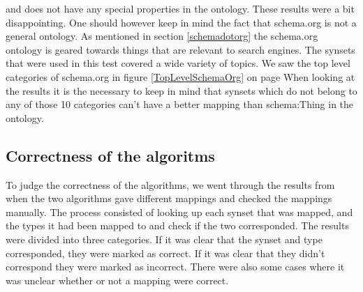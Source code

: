 and does not have any special properties in the ontology.
These results were a bit disappointing.
One should however keep in mind the fact that schema.org is not a general ontology.
As mentioned in section \ref{schemadotorg} the schema.org ontology is geared towards things that are relevant to search engines.
The synsets that were used in this test covered a wide variety of topics.
We saw the top level categories of schema.org in figure \ref {TopLevelSchemaOrg} on page \pageref{TopLevelSchemaOrg}
When looking at the results it is the necessary to keep in mind that
synsets which do not belong to any of those 10 categories can't have a better mapping than schema:Thing in the ontology.

\subsection{Correctness of the algoritms}
To judge the correctness of the algorithms,
we went through the results from when the two algorithms gave different mappings and checked the mappings manually.
The process consisted of looking up each synset that was mapped,
and the types it had been mapped to and check if the two corresponded.
The results were divided into three categories.
If it was clear that the synset and type corresponded, they were marked as correct.
If it was clear that they didn't correspond they were marked as incorrect.
There were also some cases where it was unclear whether or not a mapping were correct.

